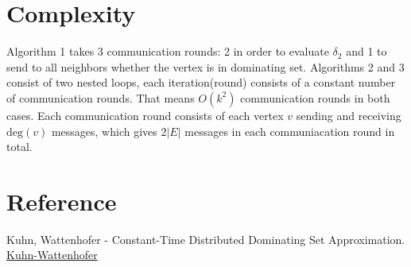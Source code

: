 \documentclass{article}
\begin{document}
\section{Complexity}
Algorithm 1 takes 3 communication rounds: 2 in order to evaluate $\delta_2$ and 1 to send to all neighbors whether the vertex is in dominating set. Algorithms 2 and 3 consist of two nested loops, each iteration(round) consists of a constant number of communication rounds. That means $O(k^2)$ communication rounds in both cases. Each communication round consists of each vertex $v$ sending and receiving $\text{deg}(v)$ messages, which gives $2|E|$ messages in each communiacation round in total.

\section{Reference}
Kuhn, Wattenhofer - Constant-Time Distributed Dominating Set Approximation.
\href{https://dl.acm.org/doi/pdf/10.1145/872035.872040}{Kuhn-Wattenhofer}
\end{document}
